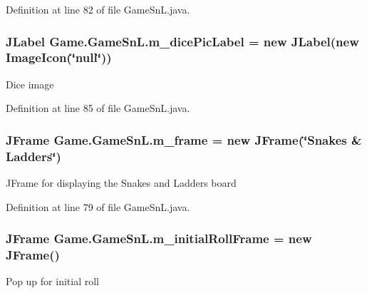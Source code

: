 Definition at line 82 of file Game\+Sn\+L.\+java.

\hypertarget{class_game_1_1_game_sn_l_a59399bbb046839055516f0ce733b9ba7}{}
\subsubsection[{m\+\_\+dice\+Pic\+Label}]{\setlength{\rightskip}{0pt plus 5cm}J\+Label Game.\+Game\+Sn\+L.\+m\+\_\+dice\+Pic\+Label = new J\+Label(new Image\+Icon(\char`\"{}null\char`\"{}))\hspace{0.3cm}{\ttfamily [private]}}\label{class_game_1_1_game_sn_l_a59399bbb046839055516f0ce733b9ba7}
Dice image 

Definition at line 85 of file Game\+Sn\+L.\+java.

\hypertarget{class_game_1_1_game_sn_l_a694cff89aec27b85a6b970b2304c6968}{}
\subsubsection[{m\+\_\+frame}]{\setlength{\rightskip}{0pt plus 5cm}J\+Frame Game.\+Game\+Sn\+L.\+m\+\_\+frame = new J\+Frame(\char`\"{}Snakes \& Ladders\char`\"{})\hspace{0.3cm}{\ttfamily [private]}}\label{class_game_1_1_game_sn_l_a694cff89aec27b85a6b970b2304c6968}
J\+Frame for displaying the Snakes and Ladders board 

Definition at line 79 of file Game\+Sn\+L.\+java.

\hypertarget{class_game_1_1_game_sn_l_ae665665dd40de7d795777635000da8eb}{}
\subsubsection[{m\+\_\+initial\+Roll\+Frame}]{\setlength{\rightskip}{0pt plus 5cm}J\+Frame Game.\+Game\+Sn\+L.\+m\+\_\+initial\+Roll\+Frame = new J\+Frame()\hspace{0.3cm}{\ttfamily [private]}}\label{class_game_1_1_game_sn_l_ae665665dd40de7d795777635000da8eb}
Pop up for initial roll 

